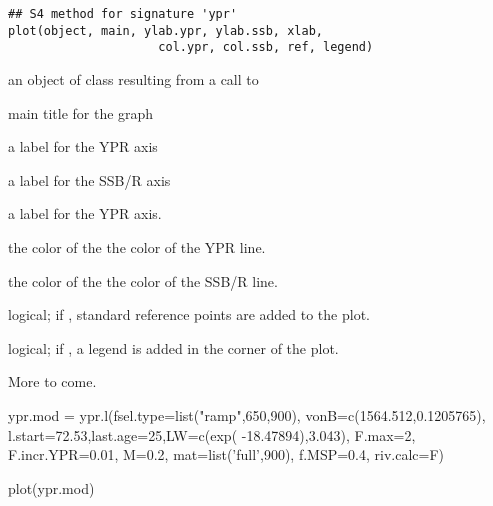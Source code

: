 \documentclass[a4paper]{book}
\begin{document}
%
\begin{Usage}
\begin{verbatim}
## S4 method for signature 'ypr'
plot(object, main, ylab.ypr, ylab.ssb, xlab, 
                     col.ypr, col.ssb, ref, legend)
\end{verbatim}
\end{Usage}
%
\begin{Arguments}
\begin{ldescription}
\item[\code{object}] an object of class  resulting from a
call to 

\item[\code{main}] main title for the graph

\item[\code{ylab.ypr}] a label for the YPR  axis

\item[\code{ylab.ssb}] a label for the SSB/R  axis

\item[\code{xlab}] a label for the YPR  axis.

\item[\code{col.ypr}] the color of the the color of the YPR line.

\item[\code{col.ssb}] the color of the the color of the SSB/R line.

\item[\code{ref}] logical; if , standard reference points are added to the plot.

\item[\code{legend}] logical; if , a legend is added in the  corner of the plot.

\end{ldescription}
\end{Arguments}
%
\begin{Details}\relax
More to come.
\end{Details}
%
\begin{SeeAlso}\relax
{}
\end{SeeAlso}
%
\begin{Examples}
\begin{ExampleCode}
ypr.mod = ypr.l(fsel.type=list("ramp",650,900), vonB=c(1564.512,0.1205765), 
                l.start=72.53,last.age=25,LW=c(exp( -18.47894),3.043), F.max=2,
                F.incr.YPR=0.01, M=0.2, mat=list('full',900), f.MSP=0.4, riv.calc=F)  

plot(ypr.mod)

\end{ExampleCode}
\end{Examples}
\end{document}
